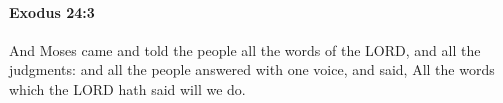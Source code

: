 
		\paragraph{Exodus 24:3} %
			\label{EXODUS-24-3}

			And Moses came and told the people all the words of the LORD, and all the judgments: and all the people answered with one voice, and said, All the words which the LORD hath said will we do.


